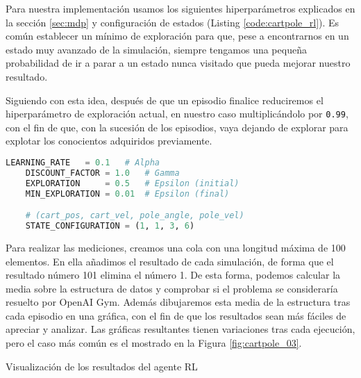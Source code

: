Para nuestra implementación usamos los siguientes hiperparámetros explicados en la sección \ref{sec:mdp} y configuración de estados (Listing \ref{code:cartpole_rl}). Es común establecer un mínimo de exploración para que, pese a encontrarnos en un estado muy avanzado de la simulación, siempre tengamos una pequeña probabilidad de ir a parar a un estado nunca visitado que pueda mejorar nuestro resultado.

Siguiendo con esta idea, después de que un episodio finalice reduciremos el hiperparámetro de exploración actual, en nuestro caso multiplicándolo por \texttt{0.99}, con el fin de que, con la sucesión de los episodios, vaya dejando de explorar para explotar los conocientos adquiridos previamente.

\begin{minipage}{0.9\linewidth}%
    \begin{lstlisting}[frame=tb, language=Python, caption=Hiperparámetros y configuración de estados, label=code:cartpole_rl]
    LEARNING_RATE   = 0.1   # Alpha
    DISCOUNT_FACTOR = 1.0   # Gamma
    EXPLORATION     = 0.5   # Epsilon (initial)
    MIN_EXPLORATION = 0.01  # Epsilon (final)

    # (cart_pos, cart_vel, pole_angle, pole_vel)
    STATE_CONFIGURATION = (1, 1, 3, 6)
    \end{lstlisting}%
\end{minipage}

Para realizar las mediciones, creamos una cola con una longitud máxima de 100 elementos. En ella añadimos el resultado de cada simulación, de forma que el resultado número 101 elimina el número 1. De esta forma, podemos calcular la media sobre la estructura de datos y comprobar si el problema se consideraría resuelto por OpenAI Gym. Además dibujaremos esta media de la estructura tras cada episodio en una gráfica, con el fin de que los resultados sean más fáciles de apreciar y analizar. Las gráficas resultantes tienen variaciones tras cada ejecución, pero el caso más común es el mostrado en la Figura \ref{fig:cartpole_03}.

%
       {Visualización de los resultados del agente RL}

